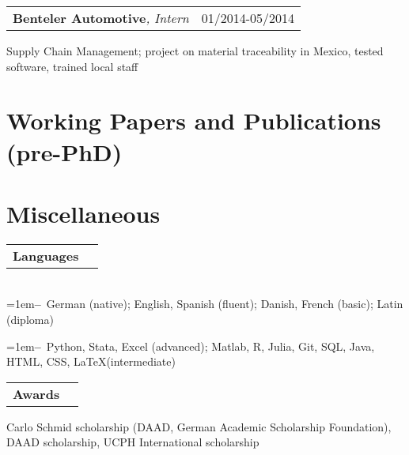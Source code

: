 \documentclass[A4,11pt]{article}
\makeatletter
\newcommand{\Subheading}[4]{   
    \begin{tabular*}{\textwidth}[t]{@{}l @{\extracolsep{\fill}} r@{}}
        \textbf{#1}\textit{\small #2} & {\footnotesize #3} \\
    \end{tabular*}
    {\small #4}
    \vspace{7pt}
}
\newcommand{\myitem}[1]{\hangindent=1em\hangafter=1\textbf{--}~#1\par}
\makeatother
\begin{document}
    \Subheading
        {Benteler Automotive}{, Intern}{01/2014-05/2014}
        {Supply Chain Management; project on material traceability in Mexico, 
        tested software, trained local staff}

\newpage

\section{Working Papers and Publications (pre-PhD)}
\setlength{}
\begin{refsection}
\nocite{*}
\printbibliography[heading=none]
\end{refsection}

\section{Miscellaneous}

    \Subheading
        {Languages}{}{}
        {\\
        \myitem{German (native); English, Spanish (fluent); Danish, French (basic); Latin (diploma)}
        \myitem{Python, Stata, Excel (advanced); Matlab, R, Julia, Git, SQL, Java, HTML, CSS, \LaTeX\space(intermediate)}
        }

    \Subheading
        {Awards}{}{}
        {Carlo Schmid scholarship (DAAD, German Academic Scholarship Foundation), 
        DAAD scholarship, 
        UCPH International scholarship
        } 

\vfill
{}
\end{document}
